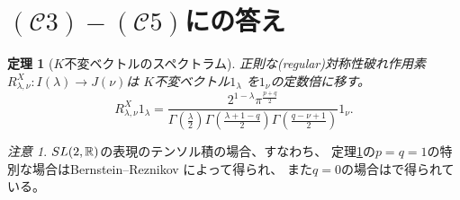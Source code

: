 \documentclass[notheorems]{beamer}
\newcommand{\tmop}[1]{\ensuremath{\operatorname{#1}}}
\newtheorem{theorem}{定理}
\theoremstyle{definition}
\theoremstyle{example}
\theoremstyle{remark}
\newtheorem*{remark}{注意}
\theoremstyle{mystyle}
\begin{document}
\section{$(\mathcal{C}3) - (\mathcal{C}5)$にの答え}
\begin{frame}
	\begin{theorem}[$K$不変ベクトルのスペクトラム]
		\label{thm:spherical}
		正則な(regular)対称性破れ作用素${R}_{\lambda,\nu}^X:I(\lambda)\to J(\nu)$は
		$K$不変ベクトル$1_\lambda$%
		を$1_\nu$の定数倍に移す。
	\begin{equation*}
		{R}_{\lambda, \nu}^X 1_{\lambda} =
		\frac{2^{1 - \lambda} \pi^{\frac{p+q}{2}}}{\Gamma \left( \frac{\lambda}{2} \right)
\Gamma \left( \frac{\lambda + 1 - q}{2} \right) \Gamma \left( \frac{q - \nu +
1}{2} \right)} 1_{\nu}.
	\end{equation*}
	\end{theorem}
	\begin{remark}
	$SL(2,\mathbb{R})$の表現のテンソル積の場合、すなわち、
	定理\ref{thm:spherical}\;の$p=q=1$の特別な場合はBernstein--Reznikov\cite[Lem. A.5]{bernstein2004estimates} によって得られ、
	また$q=0$の場合は\cite[Prop.\ 7.4]{kobayashi2015symmetry}で得られている。
	\end{remark}
\end{frame}
\end{document}
